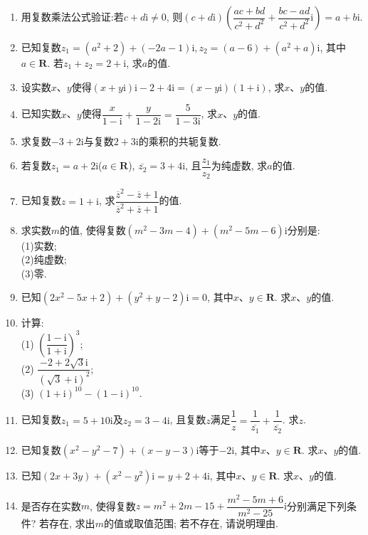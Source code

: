\documentclass[10pt,a4paper]{article}
\begin{document}
\begin{enumerate}[1.]
(9) $\dfrac{\sqrt 5+\sqrt 3\mathrm{i}}{\sqrt 5-\sqrt 3\mathrm{i}}-\dfrac{\sqrt 3+\sqrt 5\mathrm{i}}{\sqrt 3-\sqrt 5\mathrm{i}}$.
\item 用复数乘法公式验证:若$c+d\mathrm{i}\ne 0$, 则$(c+d\mathrm{i})(\dfrac{ac+bd}{c^2+d^2}+\dfrac{bc-ad}{c^2+d^2}\mathrm{i})=a+b\mathrm{i}$.
\item 已知复数$z_1=(a^2+2)+(-2a-1)\mathrm{i}, z_2=(a-6)+(a^2+a)\mathrm{i}$, 其中$a\in \mathbf{R}$. 若$z_1+z_2=2+\mathrm{i}$, 求$a$的值.
\item 设实数$x$、$y$使得$(x+y\mathrm{i})\mathrm{i}-2+4\mathrm{i}=(x-y\mathrm{i})(1+\mathrm{i})$, 求$x$、$y$的值.
\item 已知实数$x$、$y$使得$\dfrac x{1-\mathrm{i}}+ \dfrac y{1-2\mathrm{i}}= \dfrac 5{1-3\mathrm{i}}$, 求$x$、$y$的值.
\item 求复数$-3+2\mathrm{i}$与复数$2+3\mathrm{i}$的乘积的共轭复数.
\item 若复数$z_1=a+2\mathrm{i}$($a\in \mathbf{R}$), $\overline{z_2}=3+4\mathrm{i}$, 且$\dfrac{z_1}{z_2}$为纯虚数, 求$a$的值.
\item 已知复数$z=1+\mathrm{i}$, 求$\dfrac{\overline z^2-\overline z+1}{\overline z^2+\overline z+1}$的值.
\item 求实数$m$的值, 使得复数$(m^2-3m-4)+(m^2-5m-6)\mathrm{i}$分别是:\\
(1)实数;\\
(2)纯虚数;\\
(3)零.
\item 已知$(2x^2-5x+2)+(y^2+y-2)\mathrm{i}=0$, 其中$x$、$y\in \mathbf{R}$. 求$x$、$y$的值.
\item 计算:\\
(1) $(\dfrac{1-\mathrm{i}}{1+\mathrm{i}})^3$;\\
(2) $\dfrac{-2+2\sqrt 3\mathrm{i}}{(\sqrt 3+\mathrm{i})^2}$;\\
(3) $(1+\mathrm{i})^{10}-(1-\mathrm{i})^{10}$.
\item 已知复数$z_1=5+10\mathrm{i}$及$z_2=3-4\mathrm{i}$, 且复数$z$满足$\dfrac 1z=\dfrac 1{\overline{z_1}}+\dfrac 1{\overline{z_2}}$. 求$z$.
\item 已知复数$(x^2-y^2-7)+(x-y-3)\mathrm{i}$等于$-2\mathrm{i}$, 其中$x$、$y\in \mathbf{R}$. 求$x$、$y$的值.
\item 已知$(2x+3y)+(x^2-y^2)\mathrm{i}=y+2+4\mathrm{i}$, 其中$x$、$y\in \mathbf{R}$. 求$x$、$y$的值.
\item 是否存在实数$m$, 使得复数$z=m^2+2m-15+\dfrac{m^2-5m+6}{m^2-25} \mathrm{i}$分别满足下列条件? 若存在, 求出$m$的值或取值范围; 若不存在, 请说明理由.\\

\end{enumerate}
\end{document}
